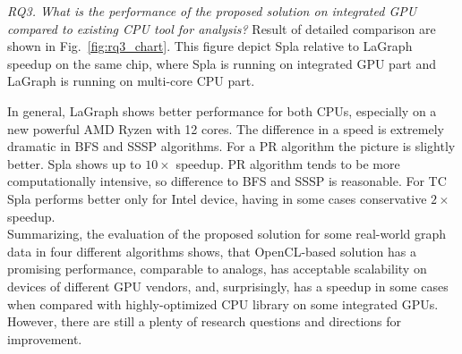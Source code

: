 \textit{RQ3. What is the performance of the proposed solution on integrated GPU compared to existing CPU tool for analysis?} Result of detailed comparison are shown in Fig.~\ref{fig:rq3_chart}. This figure depict Spla relative to LaGraph speedup on the same chip, where Spla is running on integrated GPU part and LaGraph is running on multi-core CPU part. 

In general, LaGraph shows better performance for both CPUs, especially on a new powerful AMD Ryzen with 12 cores. The difference in a speed is extremely dramatic in BFS and SSSP algorithms. For a PR algorithm the picture is slightly better. Spla shows up to $10\times$ speedup. PR algorithm tends to be more computationally intensive, so difference to BFS and SSSP is reasonable. For TC Spla performs better only for Intel device, having in some cases conservative $2\times$ speedup.\\

Summarizing, the evaluation of the proposed solution for some real-world graph data in four different algorithms shows, that OpenCL-based solution has a promising performance, comparable to analogs, has acceptable scalability on devices of different GPU vendors, and, surprisingly, has a speedup in some cases when compared with highly-optimized CPU library on some integrated GPUs. However, there are still a plenty of research questions and directions for improvement.

